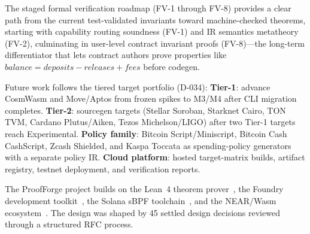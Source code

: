 \documentclass[sigconf]{acmart}
\begin{document}
The staged formal verification roadmap (FV-1 through FV-8) provides a clear path from the current
test-validated invariants toward machine-checked theorems, starting with capability routing
soundness (FV-1) and IR semantics metatheory (FV-2), culminating in user-level contract invariant
proofs (FV-8)---the long-term differentiator that lets contract authors prove properties like
$\textit{balance} = \textit{deposits} - \textit{releases} + \textit{fees}$ before codegen.

Future work follows the tiered target portfolio (D-034): \textbf{Tier-1}: advance CosmWasm
and Move/Aptos from frozen spikes to M3/M4 after CLI migration completes.
\textbf{Tier-2}: sourcegen targets (Stellar Soroban, Starknet Cairo, TON TVM, Cardano
Plutus/Aiken, Tezos Michelson/LIGO) after two Tier-1 targets reach Experimental.
\textbf{Policy family}: Bitcoin Script/Miniscript, Bitcoin Cash CashScript, Zcash Shielded,
and Kaspa Toccata as spending-policy generators with a separate policy IR.
\textbf{Cloud platform}: hosted target-matrix builds, artifact registry, testnet deployment,
and verification reports.

\begin{acks}
The ProofForge project builds on the Lean~4 theorem prover~\cite{lean4}, the Foundry
development toolkit~\cite{foundry}, the Solana sBPF toolchain~\cite{solana}, and the
NEAR/Wasm ecosystem~\cite{near}. The design was shaped by 45 settled design decisions reviewed
through a structured RFC process.
\end{acks}



\end{document}

